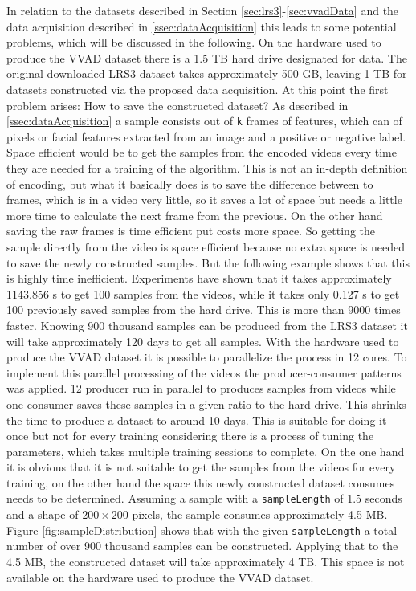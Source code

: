 In relation to the datasets described in Section \ref{sec:lrs3}-\ref{sec:vvadData} and the data acquisition described in \ref{ssec:dataAcquisition} this leads to some potential problems, which will be discussed in the following.
On the hardware used to produce the VVAD dataset there is a 1.5 TB hard drive designated for data. 
The original downloaded LRS3 dataset takes approximately 500 GB, leaving 1 TB for datasets constructed via the proposed data acquisition. 
At this point the first problem arises: How to save the constructed dataset? 
As described in \ref{ssec:dataAcquisition} a sample consists out of \texttt{k} frames of features, which can of pixels or facial features extracted from an image and a positive or negative label. 
Space efficient would be to get the samples from the encoded videos every time they are needed for a training of the algorithm.
This is not an in-depth definition of encoding, but what it basically does is to save the difference between to frames, which is in a video very little, so it saves a lot of space but needs a little more time to calculate the next frame from the previous. On the other hand saving the raw frames is time efficient put costs more space.
So getting the sample directly from the video is space efficient because no extra space is needed to save the newly constructed samples.
But the following example shows that this is highly time inefficient.
Experiments have shown that it takes approximately 1143.856 s to get 100 samples from the videos, while it takes only 0.127 s to get 100 previously saved samples from the hard drive. This is more than 9000 times faster. Knowing 900 thousand samples can be produced from the LRS3 dataset it will take approximately 120 days to get all samples. With the hardware used to produce the VVAD dataset it is possible to parallelize the process in 12 cores. 
To implement this parallel processing of the videos the producer-consumer patterns was applied. 
12 producer run in parallel to produces samples from videos while one consumer saves these samples in a given ratio to the hard drive. This shrinks the time to produce a dataset to around 10 days. This is suitable for doing it once but not for every training considering there is a process of tuning the parameters, which takes multiple training sessions to complete. 
On the one hand it is obvious that it is not suitable to get the samples from the videos for every training, on the other hand the space this newly constructed dataset consumes needs to be determined.  
Assuming a sample with a \texttt{sampleLength} of 1.5 seconds and a shape of $200\times200$ pixels, the sample consumes approximately 4.5 MB. Figure \ref{fig:sampleDistribution} shows that with the given \texttt{sampleLength} a total number of over 900 thousand samples can be constructed. Applying that to the 4.5 MB, the constructed dataset will take approximately 4 TB. This space is not available on the hardware used to produce the VVAD dataset.
